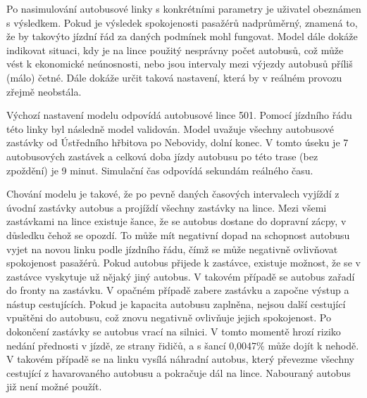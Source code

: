 \documentclass[a4paper]{article}
\begin{document}
         \begin{table}[H]
   			\centering
   			\caption{Ovlivnění celkové spokojenosti v závislosti na daném jevu (za každého jednoho pasažéra). Každý aspekt má jednu až dvě hodnoty. V případě dvou hodnot je konkrétní hodnota vybrána z dostupných variant náhodně pro každého pasažéra.}
   			\label{}
   		\end{table}
   		
     	Po nasimulování autobusové linky s konkrétními parametry je uživatel obeznámen s výsledkem. Pokud je výsledek spokojenosti pasažérů nadprůměrný, znamená to, že by takovýto jízdní řád za daných podmínek mohl fungovat. Model dále dokáže indikovat situaci, kdy je na lince použitý nesprávny počet autobusů, což může vést k ekonomické neúnosnosti, nebo jsou intervaly mezi výjezdy autobusů příliš (málo) četné. Dále dokáže určit taková nastavení, která by v reálném provozu zřejmě neobstála.
   		
   		Výchozí nastavení modelu odpovídá autobusové lince 501. Pomocí jízdního řádu této linky byl následně model validován. 
 		Model uvažuje všechny autobusové zastávky od Ústředního hřbitova po Nebovidy, dolní konec. V tomto úseku je 7 autobusových zastávek a celková doba jízdy autobusu po této trase (bez zpoždění) je 9 minut. Simulační čas odpovídá sekundám reálného času. 
 		
 		Chování modelu je takové, že po pevně daných časových intervalech vyjíždí z úvodní zastávky autobus a projíždí všechny zastávky na lince. Mezi všemi zastávkami na lince existuje šance, že se autobus dostane do dopravní zácpy, v důsledku čehož se opozdí. To může mít negativní dopad na schopnost autobusu vyjet na novou linku podle jízdního řádu, čímž se může negativně ovlivňovat spokojenost pasažérů. Pokud autobus přijede k zastávce, existuje možnost, že se v zastávce vyskytuje už nějaký jiný autobus. V takovém případě se autobus zařadí do fronty na zastávku. V opačném případě zabere zastávku a započne výstup a nástup cestujících. Pokud je kapacita autobusu zaplněna, nejsou další cestující vpuštěni do autobusu, což znovu negativně ovlivňuje jejich spokojenost. Po dokončení zastávky se autobus vrací na silnici. V tomto momentě hrozí riziko nedání přednosti v jízdě, ze strany řidičů, a s šancí 0,0047\% může dojít k nehodě.
 		V takovém případě se na linku vysílá náhradní autobus, který převezme všechny cestující z havarovaného autobusu a pokračuje dál na lince. Nabouraný autobus již není možné použít.
 		
\end{document}
